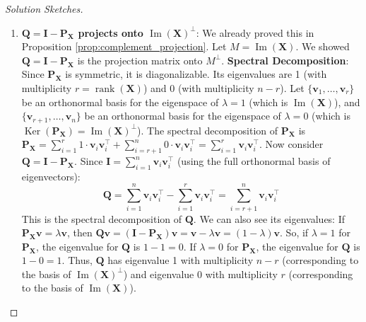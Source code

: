 \documentclass[11pt, a4paper]{article}
\DeclareMathOperator{\rank}{\mathrm{rank}}       %
\DeclareMathOperator{\Image}{\mathrm{Im}}        %
\DeclareMathOperator{\Ker}{\mathrm{Ker}}         %
\theoremstyle{definition}
\theoremstyle{remark}
\newcommand{\mat}[1]{\mathbf{#1}}       %
\newcommand{\vect}[1]{\bm{#1}}          %
\newcommand{\transpose}{^{\top}}        %
\begin{document}
\begin{proof}[Solution Sketches]
\begin{enumerate}
    \item \textbf{$\mat{Q} = \mat{I} - \mat{P}_{\mat{X}}$ projects onto $\Image(\mat{X})^{\perp}$}:
    We already proved this in Proposition \ref{prop:complement_projection}. Let $M = \Image(\mat{X})$. We showed $\mat{Q} = \mat{I} - \mat{P}_{\mat{X}}$ is the projection matrix onto $M^{\perp}$.
    \textbf{Spectral Decomposition}: Since $\mat{P}_{\mat{X}}$ is symmetric, it is diagonalizable. Its eigenvalues are 1 (with multiplicity $r = \rank(\mat{X})$) and 0 (with multiplicity $n-r$). Let $\{\vect{v}_1, \dots, \vect{v}_r\}$ be an orthonormal basis for the eigenspace of $\lambda=1$ (which is $\Image(\mat{X})$), and $\{\vect{v}_{r+1}, \dots, \vect{v}_n\}$ be an orthonormal basis for the eigenspace of $\lambda=0$ (which is $\Ker(\mat{P}_{\mat{X}}) = \Image(\mat{X})^{\perp}$).
    The spectral decomposition of $\mat{P}_{\mat{X}}$ is $\mat{P}_{\mat{X}} = \sum_{i=1}^{r} 1 \cdot \vect{v}_i \vect{v}_i\transpose + \sum_{i=r+1}^{n} 0 \cdot \vect{v}_i \vect{v}_i\transpose = \sum_{i=1}^{r} \vect{v}_i \vect{v}_i\transpose$.
    Now consider $\mat{Q} = \mat{I} - \mat{P}_{\mat{X}}$. Since $\mat{I} = \sum_{i=1}^{n} \vect{v}_i \vect{v}_i\transpose$ (using the full orthonormal basis of eigenvectors):
    \[ \mat{Q} = \sum_{i=1}^{n} \vect{v}_i \vect{v}_i\transpose - \sum_{i=1}^{r} \vect{v}_i \vect{v}_i\transpose = \sum_{i=r+1}^{n} \vect{v}_i \vect{v}_i\transpose \]
    This is the spectral decomposition of $\mat{Q}$. We can also see its eigenvalues:
    If $\mat{P}_{\mat{X}}\vect{v} = \lambda \vect{v}$, then $\mat{Q}\vect{v} = (\mat{I} - \mat{P}_{\mat{X}})\vect{v} = \vect{v} - \lambda \vect{v} = (1-\lambda)\vect{v}$.
    So, if $\lambda=1$ for $\mat{P}_{\mat{X}}$, the eigenvalue for $\mat{Q}$ is $1-1=0$.
    If $\lambda=0$ for $\mat{P}_{\mat{X}}$, the eigenvalue for $\mat{Q}$ is $1-0=1$.
    Thus, $\mat{Q}$ has eigenvalue 1 with multiplicity $n-r$ (corresponding to the basis of $\Image(\mat{X})^{\perp}$) and eigenvalue 0 with multiplicity $r$ (corresponding to the basis of $\Image(\mat{X})$).


\end{enumerate}
\end{proof}
\end{document}
